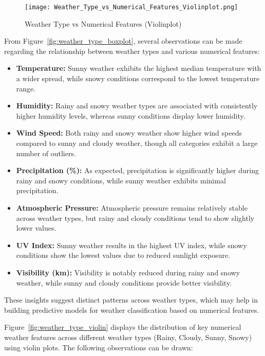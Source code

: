 \documentclass{article}
\begin{document}
\begin{figure}[H]
    \centering
    \texttt{[image: Weather\_Type\_vs\_Numerical\_Features\_Violinplot.png]}
    \caption{Weather Type vs Numerical Features (Violinplot)}
\end{figure}


From Figure~\ref{fig:weather_type_boxplot}, several observations can be made regarding the relationship between weather types and various numerical features:

\begin{itemize}
    \item \textbf{Temperature:} Sunny weather exhibits the highest median temperature with a wider spread, while snowy conditions correspond to the lowest temperature range.
    \item \textbf{Humidity:} Rainy and snowy weather types are associated with consistently higher humidity levels, whereas sunny conditions display lower humidity.
    \item \textbf{Wind Speed:} Both rainy and snowy weather show higher wind speeds compared to sunny and cloudy weather, though all categories exhibit a large number of outliers.
    \item \textbf{Precipitation (\%):} As expected, precipitation is significantly higher during rainy and snowy conditions, while sunny weather exhibits minimal precipitation.
    \item \textbf{Atmospheric Pressure:} Atmospheric pressure remains relatively stable across weather types, but rainy and cloudy conditions tend to show slightly lower values.
    \item \textbf{UV Index:} Sunny weather results in the highest UV index, while snowy conditions show the lowest values due to reduced sunlight exposure.
    \item \textbf{Visibility (km):} Visibility is notably reduced during rainy and snowy weather, while sunny and cloudy conditions provide better visibility.
\end{itemize}

These insights suggest distinct patterns across weather types, which may help in building predictive models for weather classification based on numerical features.

Figure~\ref{fig:weather_type_violin} displays the distribution of key numerical weather features across different weather types (Rainy, Cloudy, Sunny, Snowy) using violin plots. The following observations can be drawn:
\end{document}
